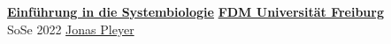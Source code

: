 \documentclass[DIN, pagenumber=false, fontsize=11pt, parskip=half]{scrartcl}
\begin{document}
\noindent\textbf{\href{https://www.fdm.uni-freiburg.de/spatsysbio/teaching/2022-04-SS-Intro-Sys-Bio}{Einführung in die Systembiologie}} \hfill \textbf{\href{https://www.fdm.uni-freiburg.de/spatsysbio}{FDM Universität Freiburg}}\\
SoSe 2022 \hfill \href{https://www.fdm.uni-freiburg.de/spatsysbio/People/JonasPleyer}{Jonas Pleyer}\\



\end{document}
